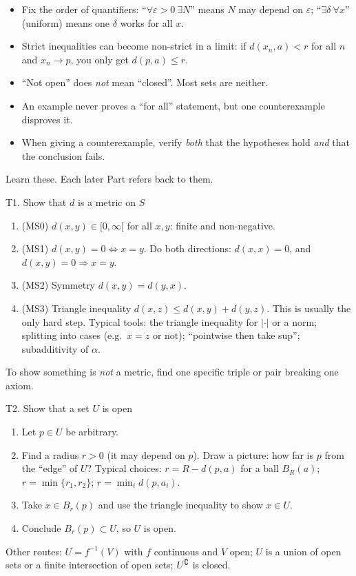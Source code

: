\begin{tip}
\begin{itemize}
\item Fix the order of quantifiers: ``$\forall \varepsilon>0\ \exists N$'' means $N$ may depend
  on $\varepsilon$; ``$\exists \delta\ \forall x$'' (uniform) means one $\delta$ works for all
  $x$.
\item Strict inequalities can become non-strict in a limit: if $d(x_n,a)<r$ for all $n$ and
  $x_n\to p$, you only get $d(p,a)\le r$.
\item ``Not open'' does \emph{not} mean ``closed''. Most sets are neither.
\item An example never proves a ``for all'' statement, but one counterexample disproves it.
\item When giving a counterexample, verify \emph{both} that the hypotheses hold \emph{and}
  that the conclusion fails.
\end{itemize}
\end{tip}

Learn these. Each later Part refers back to them.

\begin{steps}{T1. Show that $d$ is a metric on $S$}
\begin{enumerate}
\item (MS0) $d(x,y)\in[0,\infty[$ for all $x,y$: finite and non-negative.
\item (MS1) $d(x,y)=0\iff x=y$. Do both directions: $d(x,x)=0$, and $d(x,y)=0\Rightarrow x=y$.
\item (MS2) Symmetry $d(x,y)=d(y,x)$.
\item (MS3) Triangle inequality $d(x,z)\le d(x,y)+d(y,z)$. This is usually the only hard
  step. Typical tools: the triangle inequality for $|\cdot|$ or a norm; splitting into cases
  (e.g.\ $x=z$ or not); ``pointwise then take sup''; subadditivity of $\alpha$.
\end{enumerate}
To show something is \emph{not} a metric, find one specific triple or pair breaking one axiom.
\end{steps}

\begin{steps}{T2. Show that a set $U$ is open}
\begin{enumerate}
\item Let $p\in U$ be arbitrary.
\item Find a radius $r>0$ (it may depend on $p$). Draw a picture: how far is $p$ from the
  ``edge'' of $U$? Typical choices: $r=R-d(p,a)$ for a ball $B_R(a)$; $r=\min\{r_1,r_2\}$;
  $r=\min_i d(p,a_i)$.
\item Take $x\in B_r(p)$ and use the triangle inequality to show $x\in U$.
\item Conclude $B_r(p)\subset U$, so $U$ is open.
\end{enumerate}
Other routes: $U=f^{-1}(V)$ with $f$ continuous and $V$ open; $U$ is a union of open sets or a
finite intersection of open sets; $U^{\complement}$ is closed.
\end{steps}

